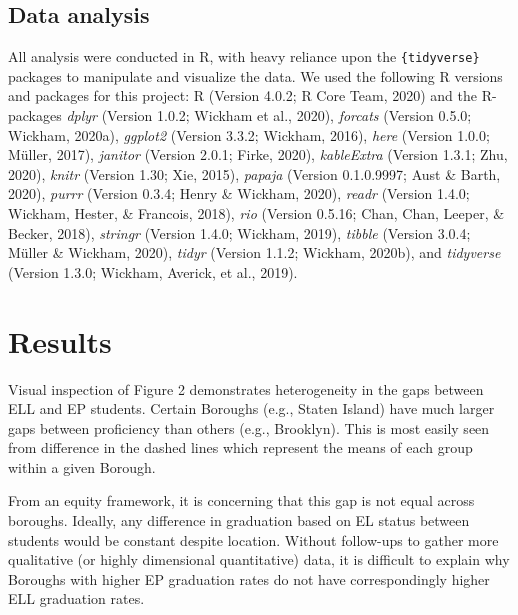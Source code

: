 \documentclass[
  english,
  man, fleqn, noextraspace]{apa6}
\begin{document}
\hypertarget{data-analysis}{%
\subsection{Data analysis}\label{data-analysis}}

All analysis were conducted in R, with heavy reliance upon the \texttt{\{tidyverse\}} packages to manipulate and visualize the data.
We used the following R versions and packages for this project:
R (Version 4.0.2; R Core Team, 2020) and the R-packages \emph{dplyr} (Version 1.0.2; Wickham et al., 2020), \emph{forcats} (Version 0.5.0; Wickham, 2020a), \emph{ggplot2} (Version 3.3.2; Wickham, 2016), \emph{here} (Version 1.0.0; Müller, 2017), \emph{janitor} (Version 2.0.1; Firke, 2020), \emph{kableExtra} (Version 1.3.1; Zhu, 2020), \emph{knitr} (Version 1.30; Xie, 2015), \emph{papaja} (Version 0.1.0.9997; Aust \& Barth, 2020), \emph{purrr} (Version 0.3.4; Henry \& Wickham, 2020), \emph{readr} (Version 1.4.0; Wickham, Hester, \& Francois, 2018), \emph{rio} (Version 0.5.16; Chan, Chan, Leeper, \& Becker, 2018), \emph{stringr} (Version 1.4.0; Wickham, 2019), \emph{tibble} (Version 3.0.4; Müller \& Wickham, 2020), \emph{tidyr} (Version 1.1.2; Wickham, 2020b), and \emph{tidyverse} (Version 1.3.0; Wickham, Averick, et al., 2019).

\hypertarget{results}{%
\section{Results}\label{results}}

Visual inspection of Figure 2 demonstrates heterogeneity in the gaps between ELL and EP students. Certain Boroughs (e.g., Staten Island) have much larger gaps between proficiency than others (e.g., Brooklyn). This is most easily seen from difference in the dashed lines which represent the means of each group within a given Borough.

From an equity framework, it is concerning that this gap is not equal across boroughs. Ideally, any difference in graduation based on EL status between students would be constant despite location. Without follow-ups to gather more qualitative (or highly dimensional quantitative) data, it is difficult to explain why Boroughs with higher EP graduation rates do not have correspondingly higher ELL graduation rates.
\end{document}
